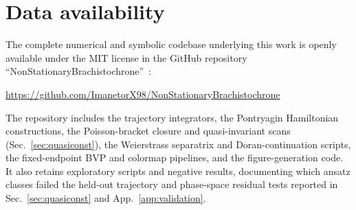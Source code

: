 \documentclass[
    aps, prd, twocolumn, superscriptaddress,
    showpacs, nofootinbib, floatfix
]{revtex4-2}
\begin{document}
\section*{Data availability}
The complete numerical and symbolic codebase underlying this work is openly
available under the MIT license in the GitHub repository
``NonStationary\-Brachi\-sto\-chrone''~\cite{Rosignoli2026Code}:
\begin{center}
\url{https://github.com/ImanetorX98/NonStationaryBrachistochrone}
\end{center}
The repository includes the trajectory integrators, the Pontryagin Hamiltonian
constructions, the Poisson-bracket closure and quasi-invariant scans
(Sec.~\ref{sec:quasiconst}), the Weierstrass separatrix and Doran-continuation
scripts, the fixed-endpoint BVP and colormap pipelines, and the
figure-generation code. It also retains exploratory scripts and negative results,
documenting which ansatz classes failed the held-out trajectory and phase-space
residual tests reported in Sec.~\ref{sec:quasiconst} and
App.~\ref{app:validation}.



\end{document}

